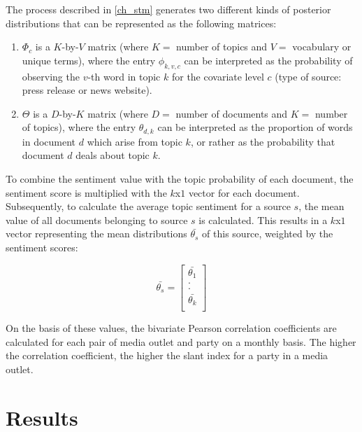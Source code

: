 \documentclass[12pt,a4paper,notitlepage]{article}
\begin{document}
The process described in \ref{ch_stm} generates two different kinds of posterior distributions that can be represented as the following matrices: 

\begin{enumerate}
	\item $\Phi_c$ is a $K$-by-$V$ matrix (where $K=$ number of topics and $V=$ vocabulary or unique terms), where the entry $\phi_{k,v,c}$ can be interpreted as the probability of observing the $v$-th word in topic $k$ for the covariate level $c$ (type of source: press release or news website). 
	\item $\Theta$ is a $D$-by-$K$ matrix (where $D=$ number of documents and $K=$ number of topics), where the entry $\theta_{d,k}$ can be interpreted as the proportion of words in document $d$ which arise from topic $k$, or rather as the probability that document $d$ deals about topic $k$. 
\end{enumerate}

To combine the sentiment value with the topic probability of each document, the sentiment score is multiplied with the $k$x$1$ vector for each document. Subsequently, to calculate the average topic sentiment for a source $s$, the mean value of all documents belonging to source $s$ is calculated. This results in a $k$x$1$ vector representing the mean distributions $\bar{ \theta_{s} }$ of this source, weighted by the sentiment scores:

\begin{equation}
	\bar{ \theta_{s} } =
	\begin{bmatrix} 
	\bar{ \theta_{1} } \\
	. \\
	. \\
	\bar{ \theta_{k} } \\
	\end{bmatrix}
\end{equation} 


On the basis of these values, the bivariate Pearson correlation coefficients are calculated for each pair of media outlet and party  on a monthly basis. The higher the correlation coefficient, the higher the slant index for a party in a media outlet.


\section{Results}
\end{document}
